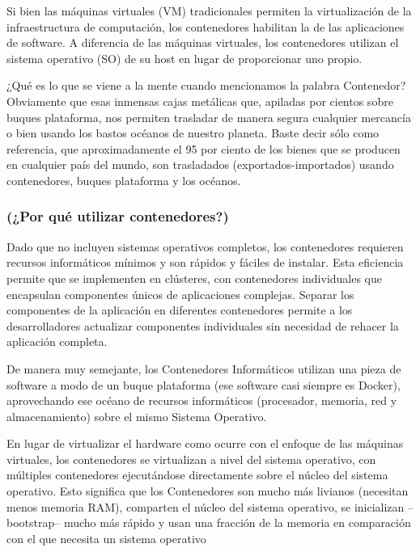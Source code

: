 \documentclass[preprint,12pt]{elsarticle}
\begin{document}
Si bien las máquinas virtuales (VM) tradicionales permiten la virtualización de la infraestructura de computación, los contenedores habilitan la de las aplicaciones de software. A diferencia de las máquinas virtuales, los contenedores utilizan el sistema operativo (SO) de su host en lugar de proporcionar uno propio.

¿Qué es lo que se viene a la mente cuando mencionamos la palabra Contenedor? Obviamente que esas inmensas cajas metálicas que, apiladas por cientos sobre buques plataforma, nos permiten trasladar de manera segura cualquier mercancía o bien usando los bastos océanos de nuestro planeta. Baste decir sólo como referencia, que aproximadamente el 95 por ciento de los bienes que se producen en cualquier país del mundo, son trasladados (exportados-importados) usando contenedores, buques plataforma y los océanos.

\subsubsection{\textbf{(¿Por qué utilizar contenedores?)}}
Dado que no incluyen sistemas operativos completos, los contenedores requieren recursos informáticos mínimos y son rápidos y fáciles de instalar. Esta eficiencia permite que se implementen en clústeres, con contenedores individuales que encapsulan componentes únicos de aplicaciones complejas. Separar los componentes de la aplicación en diferentes contenedores permite a los desarrolladores actualizar componentes individuales sin necesidad de rehacer la aplicación completa.

De manera muy semejante, los Contenedores Informáticos utilizan una pieza de software a modo de un buque plataforma (ese software casi siempre es Docker), aprovechando ese océano de recursos informáticos (procesador, memoria, red y almacenamiento) sobre el mismo Sistema Operativo.

En lugar de virtualizar el hardware como ocurre con el enfoque de las máquinas virtuales, los contenedores se virtualizan a nivel del sistema operativo, con múltiples contenedores ejecutándose directamente sobre el núcleo del sistema operativo. Esto significa que los Contenedores son mucho más livianos (necesitan menos memoria RAM), comparten el núcleo del sistema operativo, se inicializan –bootstrap– mucho más rápido y usan una fracción de la memoria en comparación con el que necesita un sistema operativo

\end{document}

